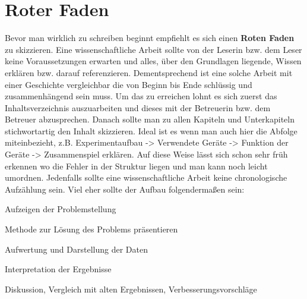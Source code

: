 \section{Roter Faden}
Bevor man wirklich zu schreiben beginnt empfiehlt es sich einen \textbf{Roten Faden} zu skizzieren. Eine wissenschaftliche Arbeit sollte von der Leserin bzw. dem Leser keine Voraussetzungen erwarten und alles, über den Grundlagen liegende, Wissen erklären bzw. darauf referenzieren. Dementsprechend ist eine solche Arbeit mit einer Geschichte vergleichbar die von Beginn bis Ende schlüssig und zusammenhängend sein muss.
        \tagmcend
\tagstructend
{}
Um das zu erreichen lohnt es sich zuerst das Inhaltsverzeichnis auszuarbeiten und dieses mit der Betreuerin bzw. dem Betreuer abzusprechen. Danach sollte man zu allen Kapiteln und Unterkapiteln stichwortartig den Inhalt skizzieren. Ideal ist es wenn man auch hier die Abfolge miteinbezieht, z.B. Experimentaufbau -> Verwendete Geräte -> Funktion der Geräte -> Zusammenspiel erklären. Auf diese Weise lässt sich schon sehr früh erkennen wo die Fehler in der Struktur liegen und man kann noch leicht umordnen.
        \tagmcend
\tagstructend
{}
Jedenfalls sollte eine wissenschaftliche Arbeit keine chronologische Aufzählung sein. Viel eher sollte der Aufbau folgendermaßen sein:
\begin{compactitem}
\item Aufzeigen der Problemstellung
\item Methode zur Lösung des Problems präsentieren
\item Aufwertung und Darstellung der Daten
\item Interpretation der Ergebnisse
\item Diskussion, Vergleich mit alten Ergebnissen, Verbesserungsvorschläge
\end{compactitem}
        \tagmcend
\tagstructend
